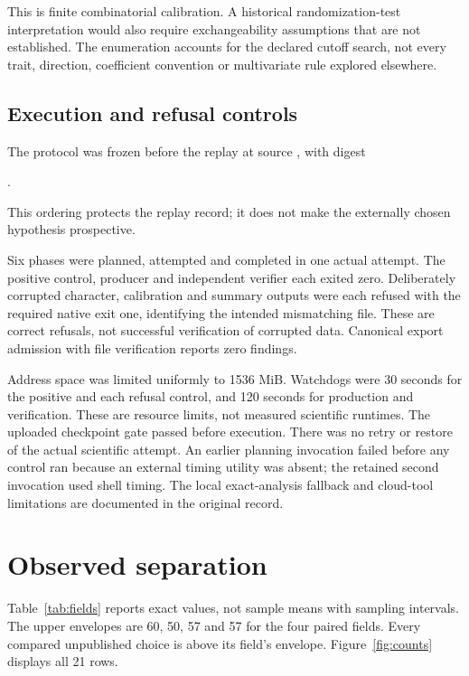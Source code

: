 \documentclass[11pt]{article}
\begin{document}
This is finite combinatorial calibration. A historical randomization-test
interpretation would also require exchangeability assumptions that are
not established. The enumeration accounts for the declared cutoff search,
not every trait, direction, coefficient convention or multivariate rule
explored elsewhere.

\subsection{Execution and refusal controls}
The protocol was frozen before the replay at source
, with digest
\begin{center}\small
{}.
\end{center}
This ordering protects the replay record; it does not make the externally
chosen hypothesis prospective.

Six phases were planned, attempted and completed in one actual attempt.
The positive control, producer and independent verifier each exited zero.
Deliberately corrupted character, calibration and summary outputs were
each refused with the required native exit one, identifying the intended
mismatching file. These are correct refusals, not successful verification
of corrupted data. Canonical export admission with file verification
reports zero findings.

Address space was limited uniformly to 1536 MiB. Watchdogs were 30 seconds
for the positive and each refusal control, and 120 seconds for production
and verification. These are resource limits, not measured scientific
runtimes. The uploaded checkpoint gate passed before execution. There
was no retry or restore of the actual scientific attempt. An earlier
planning invocation failed before any control ran because an external
timing utility was absent; the retained second invocation used shell
timing. The local exact-analysis fallback and cloud-tool limitations
are documented in the original record.

\section{Observed separation}
Table~\ref{tab:fields} reports exact values, not sample means with
sampling intervals. The upper envelopes are 60, 50, 57 and 57 for the
four paired fields. Every compared unpublished choice is above its
field's envelope. Figure~\ref{fig:counts} displays all 21 rows.
\end{document}
